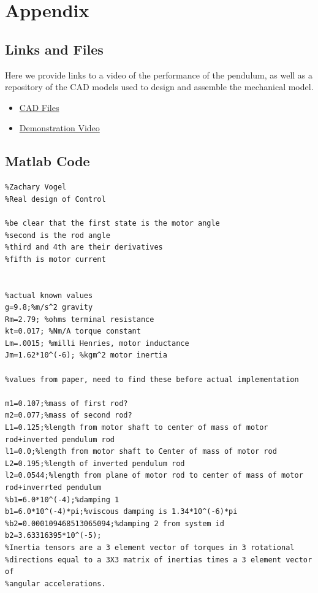 \documentclass[12pt]{extarticle}
\newenvironment{sect}
  {\adjustwidth{-2.25em}{0pt}}
  {\endadjustwidth}
\begin{document}
\newpage

\begin{sect}
\section{Appendix}
    \subsection{Links and Files}
    Here we provide links to a video of the performance of the pendulum, as well as a repository of the CAD models used to design and assemble the mechanical model.\\
    \begin{itemize}
        \item \href{https://drive.google.com/open?id=0BwfJh1j5fkByLVJjS1Q5cDhHUXM}{CAD Files}
        \item \href{https://goo.gl/photos/yyPnPPLxGd5WqKR46}{Demonstration Video}
    \end{itemize}
    \subsection{Matlab Code}
\begin{lstlisting}
%Zachary Vogel
%Real design of Control

%be clear that the first state is the motor angle
%second is the rod angle
%third and 4th are their derivatives
%fifth is motor current


%actual known values
g=9.8;%m/s^2 gravity
Rm=2.79; %ohms terminal resistance
kt=0.017; %Nm/A torque constant
Lm=.0015; %milli Henries, motor inductance
Jm=1.62*10^(-6); %kgm^2 motor inertia

%values from paper, need to find these before actual implementation

m1=0.107;%mass of first rod?
m2=0.077;%mass of second rod?
L1=0.125;%length from motor shaft to center of mass of motor rod+inverted pendulum rod
l1=0.0;%length from motor shaft to Center of mass of motor rod
L2=0.195;%length of inverted pendulum rod
l2=0.0544;%length from plane of motor rod to center of mass of motor rod+inverrted pendulum
%b1=6.0*10^(-4);%damping 1
b1=6.0*10^(-4)*pi;%viscous damping is 1.34*10^(-6)*pi
%b2=0.000109468513065094;%damping 2 from system id
b2=3.63316395*10^(-5);
%Inertia tensors are a 3 element vector of torques in 3 rotational
%directions equal to a 3X3 matrix of inertias times a 3 element vector of
%angular accelerations.


\end{lstlisting}
\end{sect}
\end{document}
